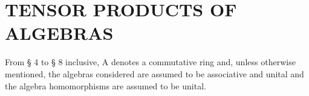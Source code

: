 \section{TENSOR PRODUCTS OF ALGEBRAS}

From § 4 to § 8 inclusive, A denotes a commutative ring and, unless otherwise mentioned, the algebras considered are assumed to be associative and unital and the algebra homomorphisms are assumed to be unital.

